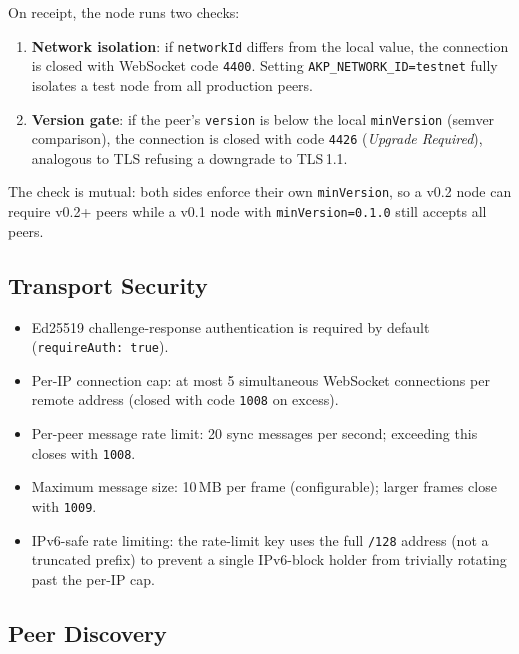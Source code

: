 \documentclass[10pt,twocolumn]{article}
\begin{document}
On receipt, the node runs two checks:
\begin{enumerate}[noitemsep,topsep=2pt]
  \item \textbf{Network isolation}: if \texttt{networkId} differs from the
        local value, the connection is closed with WebSocket code \texttt{4400}.
        Setting \texttt{AKP\_NETWORK\_ID=testnet} fully isolates a test node
        from all production peers.
  \item \textbf{Version gate}: if the peer's \texttt{version} is below the
        local \texttt{minVersion} (semver comparison), the connection is closed
        with code \texttt{4426} (\emph{Upgrade Required}), analogous to TLS
        refusing a downgrade to TLS\,1.1.
\end{enumerate}

The check is mutual: both sides enforce their own \texttt{minVersion}, so
a v0.2 node can require v0.2+ peers while a v0.1 node with
\texttt{minVersion=0.1.0} still accepts all peers.

\subsection{Transport Security}

\begin{itemize}[noitemsep,topsep=2pt]
  \item Ed25519 challenge-response authentication is required by default
        (\texttt{requireAuth: true}).
  \item Per-IP connection cap: at most 5 simultaneous WebSocket connections
        per remote address (closed with code \texttt{1008} on excess).
  \item Per-peer message rate limit: 20 sync messages per second; exceeding
        this closes with \texttt{1008}.
  \item Maximum message size: 10\,MB per frame (configurable); larger frames
        close with \texttt{1009}.
  \item IPv6-safe rate limiting: the rate-limit key uses the full
        \texttt{/128} address (not a truncated prefix) to prevent a single
        IPv6-block holder from trivially rotating past the per-IP cap.
\end{itemize}

\subsection{Peer Discovery}
\label{sec:discovery}
\end{document}

